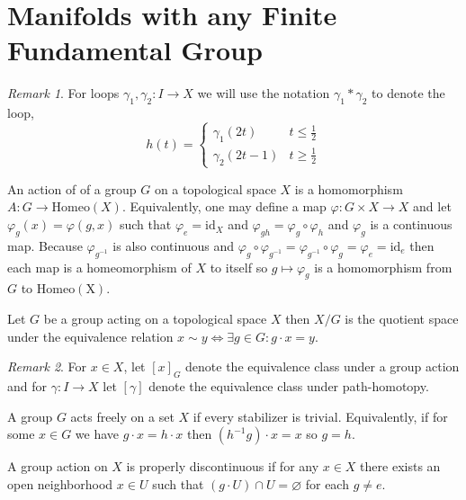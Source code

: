 \documentclass[12pt]{article}
\renewcommand{\empty}{\varnothing}
\theoremstyle{remark}
\newtheorem*{remark}{Remark}
\theoremstyle{definition}
\newenvironment{definition}[1][Definition:]{\begin{trivlist}
\item[\hskip \labelsep {\bfseries #1}]}{\end{trivlist}}
\begin{document}
\section{Manifolds with any Finite Fundamental Group}

\begin{remark}
For loops $\gamma_1, \gamma_2 : I \to X$ we will use the notation $\gamma_1 * \gamma_2$ to denote the loop, \[h(t) = \begin{cases} \gamma_1(2t) & t \le \frac{1}{2} \\ \gamma_2(2t - 1) & t \ge \frac{1}{2} \end{cases}\]
\end{remark}

\begin{definition}
An action of of a group $G$ on a topological space $X$ is a homomorphism $A : G \to \mathrm{Homeo}(X)$. Equivalently, one may define a map $\varphi : G \times X \to X$ and let $\varphi_g(x) = \varphi(g, x)$ such that $\varphi_e = \mathrm{id}_X$ and $\varphi_{gh} = \varphi_g \circ \varphi_h$ and $\varphi_g$ is a continuous map. Because $\varphi_{g^{-1}}$ is also continuous and $\varphi_g \circ \varphi_{g^{-1}} = \varphi_{g^{-1}} \circ \varphi_{g} = \varphi_e = \mathrm{id}_e$ then each map is a homeomorphism of $X$ to itself so $g \mapsto \varphi_g$ is a homomorphism from $G$ to $\mathrm{Homeo(X)}$.  
\end{definition}

\begin{definition}
Let $G$ be a group acting on a topological space $X$ then $X/G$ is the quotient space under the equivalence relation $x \sim y \iff \exists g \in G : g \cdot x = y$. 
\end{definition}

\begin{remark}
For $x \in X$, let $[x]_G$ denote the equivalence class under a group action and for $\gamma : I \to X$ let $[\gamma]$ denote the equivalence class under path-homotopy. 
\end{remark}

\begin{definition}
A group $G$ acts freely on a set $X$ if every stabilizer is trivial. Equivalently, if for some $x \in G$ we have $g \cdot x = h \cdot x$ then $(h^{-1}g) \cdot x = x$ so $g = h$. 
\end{definition}

\begin{definition}
A group action on $X$ is properly discontinuous if for any $x \in X$ there exists an open neighborhood $x \in U$ such that $(g \cdot U) \cap U = \empty$ for each $g \neq e$. 
\end{definition}
\end{document}
